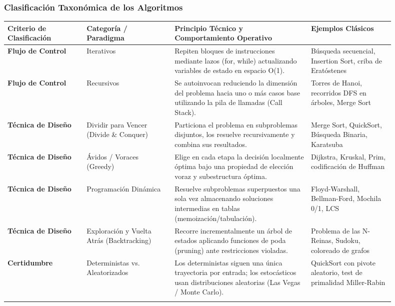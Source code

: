 \documentclass[11pt,letterpaper]{article}
\begin{document}
\subsubsection*{Clasificación Taxonómica de los Algoritmos}
\vspace{4pt}\noindent
\begin{tabular}{>{\raggedright\arraybackslash}p{0.180\linewidth}>{\raggedright\arraybackslash}p{0.208\linewidth}>{\raggedright\arraybackslash}p{0.318\linewidth}>{\raggedright\arraybackslash}p{0.194\linewidth}}
\toprule
\textbf{\color{ipnguinda}Criterio de Clasificación} & \textbf{\color{ipnguinda}Categoría / Paradigma} & \textbf{\color{ipnguinda}Principio Técnico y Comportamiento Operativo} & \textbf{\color{ipnguinda}Ejemplos Clásicos} \\
\midrule
\textbf{Flujo de Control} & Iterativos & Repiten bloques de instrucciones mediante lazos (for, while) actualizando variables de estado en espacio O(1). & Búsqueda secuencial, Insertion Sort, criba de Eratóstenes \\
\addlinespace[3pt]
\textbf{Flujo de Control} & Recursivos & Se autoinvocan reduciendo la dimensión del problema hacia uno o más casos base utilizando la pila de llamadas (Call Stack). & Torres de Hanoi, recorridos DFS en árboles, Merge Sort \\
\addlinespace[3pt]
\textbf{Técnica de Diseño} & Dividir para Vencer (Divide \& Conquer) & Particiona el problema en subproblemas disjuntos, los resuelve recursivamente y combina sus resultados. & Merge Sort, QuickSort, Búsqueda Binaria, Karatsuba \\
\addlinespace[3pt]
\textbf{Técnica de Diseño} & Ávidos / Voraces (Greedy) & Elige en cada etapa la decisión localmente óptima bajo una propiedad de elección voraz y subestructura óptima. & Dijkstra, Kruskal, Prim, codificación de Huffman \\
\addlinespace[3pt]
\textbf{Técnica de Diseño} & Programación Dinámica & Resuelve subproblemas superpuestos una sola vez almacenando soluciones intermedias en tablas (memoización/tabulación). & Floyd-Warshall, Bellman-Ford, Mochila 0/1, LCS \\
\addlinespace[3pt]
\textbf{Técnica de Diseño} & Exploración y Vuelta Atrás (Backtracking) & Recorre incrementalmente un árbol de estados aplicando funciones de poda (pruning) ante restricciones violadas. & Problema de las N-Reinas, Sudoku, coloreado de grafos \\
\addlinespace[3pt]
\textbf{Certidumbre} & Deterministas vs. Aleatorizados & Los deterministas siguen una única trayectoria por entrada; los estocásticos usan distribuciones aleatorias (Las Vegas / Monte Carlo). & QuickSort con pivote aleatorio, test de primalidad Miller-Rabin \\
\addlinespace[3pt]
\bottomrule
\end{tabular}
\end{document}
